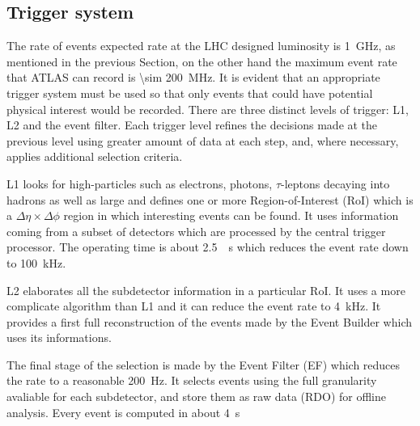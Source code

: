 \subsection{Trigger system}
The rate of events expected rate at the LHC designed luminosity is \SI{1}{GHz}, as mentioned in the previous Section, on the other hand the maximum event rate that ATLAS can record is \SI{\sim 200}{MHz}. It is evident that an appropriate trigger system must be used so that only events that could have potential physical interest would be recorded. There are three distinct levels of trigger: L1, L2 and the event filter. Each trigger level refines the decisions made at the previous level using greater amount of data at each step, and, where necessary, applies additional selection criteria.

L1 looks for high-\pt particles such as electrons, photons, $\tau$-leptons decaying into hadrons as well as large \met and defines one or more Region-of-Interest (RoI) which is a $\Delta \eta \times \Delta \phi$ region in which interesting events can be found. It uses information coming from a subset of detectors which are processed by the central trigger processor. The operating time is about \SI{2.5}{\mu s} which reduces the event rate down to \SI{100}{kHz}.

L2 elaborates all the subdetector information in a particular RoI. It uses a more complicate algorithm than L1 and it can reduce the event rate to \SI{4}{kHz}. It provides a first full reconstruction of the events made by the Event Builder which uses its informations.

The final stage of the selection is made by the Event Filter (EF) which reduces the rate to a reasonable \SI{200}{Hz}. It selects events using the full granularity avaliable for each subdetector, and store them as raw data (RDO) for offline analysis. Every event is computed in about \SI{4}{s}








